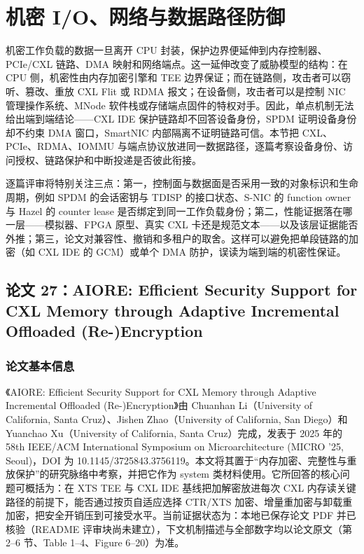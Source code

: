 \documentclass[11pt]{ctexart}
\begin{document}
\section{机密 I/\allowbreak{}O、网络与数据路径防御}
机密工作负载的数据一旦离开 CPU 封装，保护边界便延伸到内存控制器、PCIe/CXL 链路、DMA 映射和网络端点。这一延伸改变了威胁模型的结构：在 CPU 侧，机密性由内存加密引擎和 TEE 边界保证；而在链路侧，攻击者可以窃听、篡改、重放 CXL Flit 或 RDMA 报文；在设备侧，攻击者可以是控制 NIC 管理操作系统、MNode 软件栈或存储端点固件的特权对手。因此，单点机制无法给出端到端结论——CXL IDE 保护链路却不回答设备身份，SPDM 证明设备身份却不约束 DMA 窗口，SmartNIC 内部隔离不证明链路可信。本节把 CXL、PCIe、RDMA、IOMMU 与端点协议放进同一数据路径，逐篇考察设备身份、访问授权、链路保护和中断投递是否彼此衔接。\par
逐篇评审将特别关注三点：第一，控制面与数据面是否采用一致的对象标识和生命周期，例如 SPDM 的会话密钥与 TDISP 的接口状态、S-NIC 的 function owner 与 Hazel 的 counter lease 是否绑定到同一工作负载身份；第二，性能证据落在哪一层——模拟器、FPGA 原型、真实 CXL 卡还是规范文本——以及该层证据能否外推；第三，论文对兼容性、撤销和多租户的取舍。这样可以避免把单段链路的加密（如 CXL IDE 的 GCM）或单个 DMA 防护，误读为端到端的机密性保证。\par
\subsection{论文 27：AIORE: Efficient Security Support for CXL Memory through Adaptive Incremental Offloaded (Re-)Encryption}
\subsubsection{论文基本信息}
《AIORE: Efficient Security Support for CXL Memory through Adaptive Incremental Offloaded (Re-)Encryption》由 Chuanhan Li（University of California, Santa Cruz）、Jishen Zhao（University of California, San Diego）和 Yuanchao Xu（University of California, Santa Cruz）完成，发表于 2025 年的 58th IEEE/ACM International Symposium on Microarchitecture (MICRO '25, Seoul)，DOI 为 10.1145/3725843.3756119。本文将其置于“内存加密、完整性与重放保护”的研究脉络中考察，并把它作为 system 类材料使用。它所回答的核心问题可概括为：在 XTS TEE 与 CXL IDE 基线把加解密放进每次 CXL 内存读关键路径的前提下，能否通过按页自适应选择 CTR/XTS 加密、增量重加密与卸载重加密，把安全开销压到可接受水平。当前证据状态为：本地已保存论文 PDF 并已核验（README 评审块尚未建立），下文机制描述与全部数字均以论文原文（第 2--6 节、Table 1--4、Figure 6--20）为准。\cite{li2025aiore}\par
\end{document}
